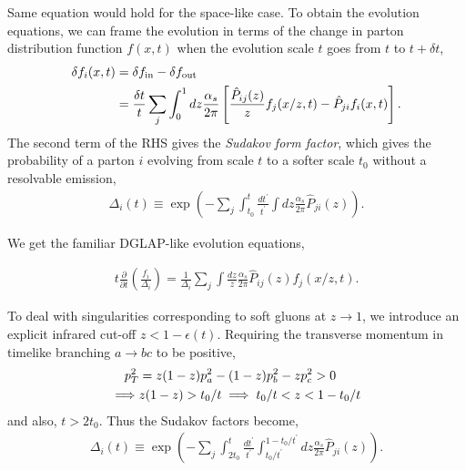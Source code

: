 Same equation would hold for the space-like case.
%
To obtain the evolution equations, we can frame the evolution in terms of the change in parton distribution function \(f(x,t)\) when the evolution scale \(t\) goes from \(t\) to \(t+\delta t\),
%
\begin{align}
	\delta f_i(x, t) & = \delta f_\mathrm{in} - \delta f_\mathrm{out} \notag                                                                                     \\
	                 & =\frac{\delta t}{t} \sum_j \int_{0}^{1} dz \frac{\alpha_s}{2\pi} \left[\frac{\hat{P}_{ij}(z)}{z}f_j(x/z, t) - \hat{P}_{ji}f_i(x,t)\right].
\end{align}
%
The second term of the RHS gives the \emph{Sudakov form factor}, which gives the probability of a parton \(i\) evolving from scale \(t\) to a softer scale \(t_0\) without a resolvable emission,
%
\begin{align}
	\Delta_i(t) \equiv \exp(-\sum_j\int_{t_0}^{t} \frac{dt^\prime}{t^\prime}\int dz\frac{\alpha_s}{2\pi} \hat{P}_{ji}(z)).
\end{align}

We get the familiar DGLAP-like evolution equations,

\begin{align}
	t\frac{\partial}{\partial t}\left(\frac{f_i}{\Delta_i}\right) = \frac{1}{\Delta_i}\sum_j \int \frac{dz}{z}\frac{\alpha_s}{2\pi}
	\hat{P}_{ij}(z)f_j(x/z, t).\end{align}


To deal with singularities corresponding to soft gluons at \(z\to 1\), we introduce an explicit infrared cut-off \(z < 1-\epsilon(t)\).  Requiring the transverse momentum in timelike branching \(a\to bc\) to be positive,
\begin{align}
	p_T^2    & = z(1-z)p_a^2 - (1-z)p_b^2 - zp_c^2 > 0 \notag \\
	\implies & z(1-z) > t_0/t \implies t_0/t < z < 1 - t_0/t
\end{align}
and also, \(t > 2t_0\). Thus the Sudakov factors become,
%
\begin{align}
	\Delta_i(t) \equiv \exp(-\sum_j\int_{2t_0}^{t}
	\frac{dt^\prime}{t^\prime}
	\int_{t_0/t^\prime}^{1-t_0/t^\prime} dz
	\frac{\alpha_s}{2\pi} \hat{P}_{ji}(z)).
	\label{eq:col`inearSudakov}
\end{align}

